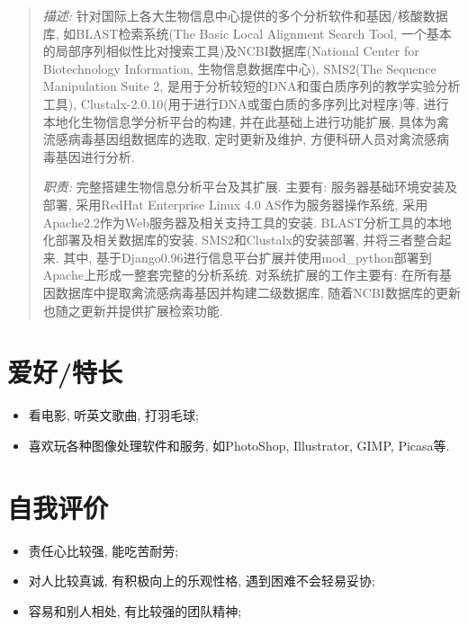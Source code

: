 \documentclass[a4paper,10pt,english]{manual}
\begin{document}
\begin{itemize}
\begin{quote}
\emph{描述:} 针对国际上各大生物信息中心提供的多个分析软件和基因/核酸数据库, 如BLAST检索系统(The Basic Local Alignment Search Tool, 一个基本的局部序列相似性比对搜索工具)及NCBI数据库(National Center for Biotechnology Information, 生物信息数据库中心), SMS2(The Sequence Manipulation Suite 2, 是用于分析较短的DNA和蛋白质序列的教学实验分析工具), Clustalx-2.0.10(用于进行DNA或蛋白质的多序列比对程序)等, 进行本地化生物信息学分析平台的构建, 并在此基础上进行功能扩展, 具体为禽流感病毒基因组数据库的选取, 定时更新及维护, 方便科研人员对禽流感病毒基因进行分析.

\emph{职责:} 完整搭建生物信息分析平台及其扩展. 主要有: 服务器基础环境安装及部署, 采用RedHat Enterprise Linux 4.0 AS作为服务器操作系统, 采用Apache2.2作为Web服务器及相关支持工具的安装. BLAST分析工具的本地化部署及相关数据库的安装, SMS2和Clustalx的安装部署, 并将三者整合起来. 其中, 基于Django0.96进行信息平台扩展并使用mod\_python部署到Apache上形成一整套完整的分析系统. 对系统扩展的工作主要有: 在所有基因数据库中提取禽流感病毒基因并构建二级数据库, 随着NCBI数据库的更新也随之更新并提供扩展检索功能.

\end{quote}


\end{itemize}


\section{爱好/特长}
\begin{itemize}
\item {} 
看电影, 听英文歌曲, 打羽毛球;

\item {} 
喜欢玩各种图像处理软件和服务, 如PhotoShop, Illustrator, GIMP, Picasa等.

\end{itemize}


\section{自我评价}
\begin{itemize}
\item {} 
责任心比较强, 能吃苦耐劳;

\item {} 
对人比较真诚, 有积极向上的乐观性格, 遇到困难不会轻易妥协;

\item {} 
容易和别人相处, 有比较强的团队精神;

\end{itemize}
\end{document}
